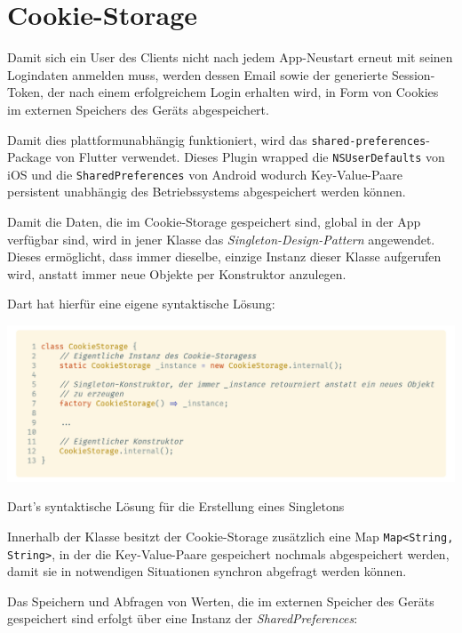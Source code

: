 \section{Cookie-Storage}

Damit sich ein User des Clients nicht nach jedem App-Neustart erneut mit seinen Logindaten anmelden muss,
werden dessen Email sowie der generierte Session-Token, der nach einem erfolgreichem Login erhalten wird, 
in Form von Cookies im externen Speichers des Geräts abgespeichert.


Damit dies plattformunabhängig funktioniert, wird das \lstinline{shared-preferences}-Package von Flutter
verwendet.
Dieses Plugin wrapped die \lstinline{NSUserDefaults} von iOS und die \lstinline{SharedPreferences} von Android
wodurch Key-Value-Paare persistent unabhängig des Betriebssystems abgespeichert werden können.

Damit die Daten, die im Cookie-Storage gespeichert sind, global in der App verfügbar sind, wird in jener
Klasse das \textit{Singleton-Design-Pattern} angewendet. Dieses ermöglicht, dass immer dieselbe, einzige Instanz
dieser Klasse aufgerufen wird, anstatt immer neue Objekte per Konstruktor anzulegen.

\newpage

Dart hat hierfür eine eigene syntaktische Lösung:

\begin{code}
    \centering
    \includegraphics[width=1\textwidth]{images/Dart/util/cookie-storage/cookieStorageSingleton.png}
    \caption{Dart's syntaktische Lösung für die Erstellung eines Singletons}
\end{code}

Innerhalb der Klasse besitzt der Cookie-Storage zusätzlich eine Map \lstinline{Map<String, String>}, in der die Key-Value-Paare
gespeichert nochmals abgespeichert werden, damit sie in notwendigen Situationen synchron abgefragt werden können.

Das Speichern und Abfragen von Werten, die im externen Speicher des Geräts gespeichert sind erfolgt über
eine Instanz der \textit{SharedPreferences}:

